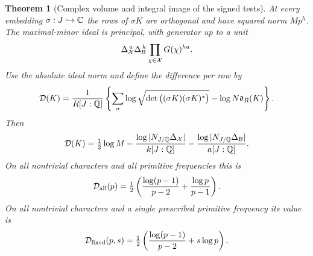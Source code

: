 \documentclass[a4paper,11pt]{article}
\newtheorem{theorem}[proposition]{Theorem}
\theoremstyle{definition}
\theoremstyle{remark}
\numberwithin{equation}{section}
\begin{document}
\begin{theorem}[Complex volume and integral image of the signed tests]\leavevmode
\label{thm:periodvolume331}
At every embedding \(\sigma:J\hookrightarrow\mathbb C\) the rows of
\(\sigma K\) are orthogonal and have squared norm \(Mp^h\).
The maximal-minor ideal is principal, with generator up to a unit
\[
  \Delta_{\cal X}^{\,a}\Delta_{\cal B}^{\,k}
                 \prod_{\chi\in{\cal X}} G(\chi)^{ha}.
\]
Use the absolute ideal norm and define the difference per row by
\[
 {\cal D}(K)=\frac{1}{R[J:\mathbb Q]}
 \left\{\sum_{\sigma}\log\sqrt{\det\big((\sigma K)(\sigma K)^*\big)}
             -\log N\mathfrak d_R(K)\right\}.
\]
Then
\[
 {\cal D}(K)=\tfrac12\log M
   -\frac{\log|N_{J/\mathbb Q}\Delta_{\cal X}|}{k[J:\mathbb Q]}
   -\frac{\log|N_{J/\mathbb Q}\Delta_{\cal B}|}{a[J:\mathbb Q]} .
\]
On all nontrivial characters and all primitive frequencies this is
\[
 {\cal D}_{\rm all}(p)=
      \tfrac12\left(\frac{\log(p-1)}{p-2}
                         +\frac{\log p}{p-1}\right).
\]
On all nontrivial characters and a single prescribed primitive
frequency its value is
\[
 {\cal D}_{\rm fixed}(p,s)=
      \tfrac12\left(\frac{\log(p-1)}{p-2}+s\log p\right).
\]
\end{theorem}
\end{document}
